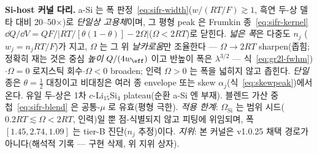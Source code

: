 \begin{keybox}
\textbf{Si-host 커널 다리.} a-Si 는 폭 판정~\eqref{eq:sifr-width}($w/(RT/F)\gtrsim1$, 흑연 두-상 델타 대비
20--50$\times$)로 \emph{단일상 고용체}이며, 그 평형 peak 은 Frumkin 종~\eqref{eq:sifr-kernel}
$\dd Q/\dd V=QF/|RT/[\theta(1-\theta)]-2\Omega|$($\Omega<2RT$)로 닫힌다. \emph{넓은 폭}은 다중도 $n_j$
($w_j{=}n_jRT/F$)가 지고, $\Omega$ 는 그 위 \emph{날카로움}만 조율한다 --- $\Omega{\to}2RT$ sharpen(좁힘;
정확히 재는 것은 중심 \emph{높이} $Q/(4w_\eff)$ 이고 반높이 폭은 $\lambda^{3/2}$ --- 식~\eqref{eq:gr2l-fwhm})
$\cdot\Omega{=}0$ 로지스틱 회수$\cdot\Omega<0$ broaden; 인력 $\Omega{>}0$ 는 폭을 넓히지 않고 좁힌다. \emph{단일} 종은
$\theta{=}\tfrac12$ 대칭이고 비대칭은 여러 종 envelope 또는 skew $\alpha_j$(식~\eqref{eq:skewpeak})에서 온다.
유일 두-상은 1차 $c$-Li$_{15}$Si$_4$
plateau(순환 a-Si 엔 부재). 블렌드 가산 중첩~\eqref{eq:sifr-blend} 은 공통-$\mu$ 로 유효(평형 극한).
\emph{적용 한계}: $\Omega_\mathrm{Si}$ 는 범위 시드($0.2RT\lesssim\Omega<2RT$, 인력)일 뿐 점-식별되지 않고
피팅에 위임되며, 폭 $[1.45,2.74,1.09]$ 는 tier-B 진단($n_j$ 추정)이다.
\emph{지위}: 본 커널은 v1.0.25 채택 경로가 아니다(해석적 기록 --- 구현 삭제, 위 지위 상자).
\end{keybox}

